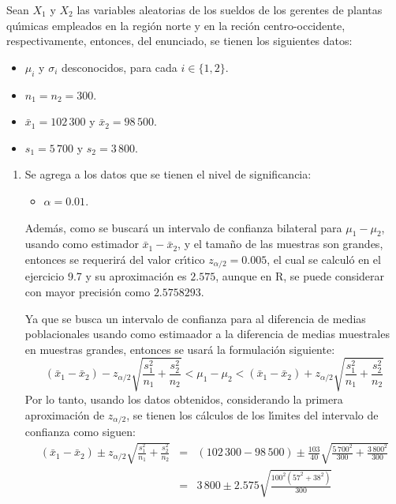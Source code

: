 \begin{solucion}
 Sean $X_1$ y $X_2$ las variables aleatorias de los sueldos de los gerentes de plantas qu\'{\i}micas empleados en la regi\'on norte y en la reci\'on centro-occidente, respectivamente, entonces, del enunciado, se tienen los siguientes datos:
 \begin{itemize}
  \item $\mu_i$ y $\sigma_i$ desconocidos, para cada $i \in \{ 1, 2 \}$.
  \item $n_1 = n_2 = 300$.
  \item $\bar{x}_1 = 102\,300$ y $\bar{x}_2 = 98\,500$.
  \item $s_1 = 5\,700$ y $s_2 = 3\,800$.
 \end{itemize}
 \begin{enumerate}
  \item Se agrega a los datos que se tienen el nivel de significancia:
  \begin{itemize}
   \item $\alpha = 0.01$.
  \end{itemize}
  Adem\'as, como se buscar\'a un intervalo de confianza bilateral para $\mu_1 - \mu_2$, usando como estimador $\bar{x}_1 - \bar{x}_2$, y el tama\~no de las muestras son grandes, entonces se requerir\'a del valor cr\'{\i}tico $z_{\alpha/2} = 0.005$, el cual se calcul\'o en el ejercicio 9.7 y su aproximaci\'on es $2.575$, aunque en R, se puede considerar con mayor precisi\'on como $2.5758293$.
  \par 
  Ya que se busca un intervalo de confianza para al diferencia de medias poblacionales usando como estimaador a la diferencia de medias muestrales en muestras grandes, entonces se usar\'a la formulaci\'on siguiente:
  \begin{equation*}
   \left( \bar{x}_1 - \bar{x}_2 \right) - z_{\alpha/2}\sqrt{\frac{s_1^2}{n_1} + \frac{s_2^2}{n_2}} < \mu_1 - \mu_2 < \left( \bar{x}_1 - \bar{x}_2 \right) + z_{\alpha/2}\sqrt{\frac{s_1^2}{n_1} + \frac{s_2^2}{n_2}}
  \end{equation*}
  Por lo tanto, usando los datos obtenidos, considerando la primera aproximaci\'on de $z_{\alpha/2}$, se tienen los c\'alculos de los l\'{\i}mites del intervalo de confianza como siguen:
  \begin{eqnarray*}
   \left( \bar{x}_1 - \bar{x}_2 \right) \pm z_{\alpha/2}\sqrt{\frac{s_1^2}{n_1} + \frac{s_2^2}{n_2}} & = & (102\,300 - 98\,500) \pm \frac{103}{40} \sqrt{\frac{5\,700^2}{300} + \frac{3\,800^2}{300}} \\
   & = & 3\,800 \pm 2.575\sqrt{\frac{100^2\left( 57^2 + 38^2 \right)}{300}} \\

\end{eqnarray*}
\end{enumerate}
\end{solucion}
